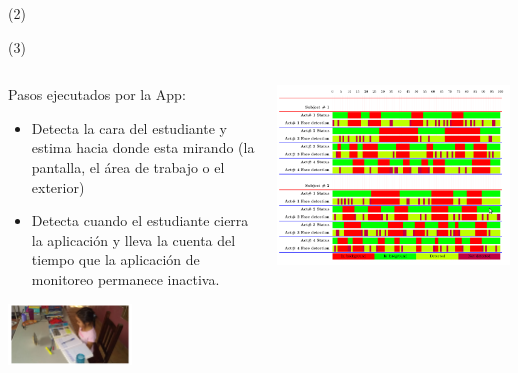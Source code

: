 \begin{frame}{ (2)}
\end{frame}

\begin{frame}{ (3)}


\begin{columns}
\begin{column}{0.5\textwidth}
\begin{block}{Pasos ejecutados por la App: } 
		\begin{itemize}
		\item Detecta la cara del estudiante y estima hacia donde esta mirando (la pantalla, el área de trabajo o el exterior)
		\item Detecta cuando el estudiante cierra la aplicación y lleva la cuenta del tiempo que la aplicación de monitoreo permanece inactiva. 
		\end{itemize}
\end{block} 
	\begin{center}
		 \includegraphics[width=0.50\textwidth]{Figs/LearningMonitoring3}
	\end{center}
\end{column}
\begin{column}{0.5\textwidth}  
    \begin{center}
     \includegraphics[width=0.99\textwidth]{Figs/LearningMonitoring4}
     \end{center}
\end{column}
\end{columns}

\end{frame}


